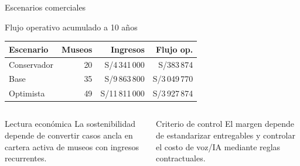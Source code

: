 \documentclass[aspectratio=169,11pt]{beamer}
\begin{document}
\begin{frame}{Escenarios comerciales}
  \begin{block}{Flujo operativo acumulado a 10 años}
    \scriptsize
    \setlength{\tabcolsep}{3pt}
    \renewcommand{\arraystretch}{1.12}
    \begin{tabular}{p{3.0cm} r r r}
      \toprule
      Escenario & Museos & Ingresos & Flujo op. \\
      \midrule
      Conservador & 20 & S/4\,341\,000 & S/383\,874 \\
      Base & 35 & S/9\,863\,800 & S/3\,049\,770 \\
      Optimista & 49 & S/11\,811\,000 & S/3\,927\,874 \\
      \bottomrule
    \end{tabular}
  \end{block}

  \begin{columns}[T,totalwidth=\textwidth]
      \begin{block}{Lectura económica}
        \scriptsize
        La sostenibilidad depende de convertir casos ancla en cartera activa
        de museos con ingresos recurrentes.
      \end{block}
      \begin{block}{Criterio de control}
        \scriptsize
        El margen depende de estandarizar entregables y controlar el costo de
        voz/IA mediante reglas contractuales.
      \end{block}
  \end{columns}
\end{frame}

\end{document}
